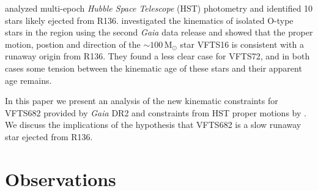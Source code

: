 \documentclass[a4paper,fleqn,usenatbib]{mnras}
\newcommand{\Msun}{{\,\mathrm{M}_\odot}}
\begin{document}
\citet{platais:15,platais:18} analyzed multi-epoch \emph{Hubble Space
  Telescope} (HST) photometry and identified 10 stars likely ejected
from R136. \citet{lennon:18} investigated the kinematics of  isolated
O-type stars in the region using the second \emph{Gaia} data release
\cite[DR2,][]{gaia:16,brown:18} and showed that the proper motion,
postion and direction of the $\sim$$100\Msun$ star VFTS16 is consistent
with a runaway origin from R136. They found a less clear case for
VFTS72, and in both cases some tension between the kinematic age of
these stars and their apparent age remains. 



In this paper we present an analysis of the new kinematic
constraints for VFTS682 provided by \emph{Gaia} DR2 and constraints
from HST proper motions  by \citet{platais:18}.   We discuss the
implications of the hypothesis that VFTS682 is a slow runaway star
ejected from R136.




\section{Observations}
\label{sec:sample}
\end{document}
